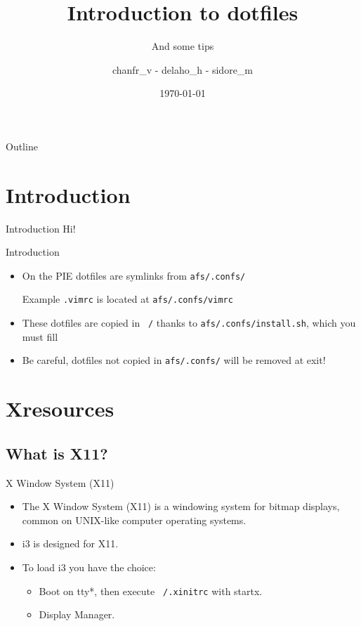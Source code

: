 \documentclass{beamer}
\title[Introduction to dotfiles]{Introduction to dotfiles}
\subtitle[And some tips]{And some tips}
\author{chanfr\_v - delaho\_h - sidore\_m}
\date{\today}
\begin{document}
\frame{\maketitle}

\begin{frame}{Outline}
  \tableofcontents
\end{frame}

\section*{Introduction}
\begin{frame}{Introduction}
  Hi!
\end{frame}


\begin{frame}{Introduction}
  \begin{itemize}
    \item On the PIE dotfiles are symlinks from \texttt{afs/.confs/}
    \begin{exampleblock}{Example}
      \texttt{.vimrc} is located at \texttt{afs/.confs/vimrc}
      \end{exampleblock}
    \item These dotfiles are copied in \texttt{~/} thanks to \texttt{afs/.confs/install.sh}, which you must fill
    \item Be careful, dotfiles not copied in \texttt{afs/.confs/} will be removed at exit!
  \end{itemize}
\end{frame}

\section{Xresources}
\subsection*{What is X11?}
\begin{frame}{X Window System (X11)}
\begin{itemize}
  \item The X Window System (X11) is a windowing system for bitmap displays, common on UNIX-like computer operating systems.
  \item i3 is designed for X11.
  \item To load i3 you have the choice:
    \begin{itemize}
      \item Boot on tty*, then execute \texttt{~/.xinitrc} with startx.
      \item Display Manager.
    \end{itemize}
\end{itemize}
\end{frame}
\end{document}
